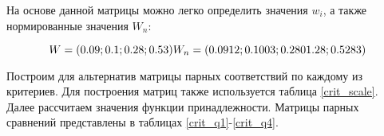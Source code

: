 
  \begin{table}[H]
    \caption{Шкала оценок критериев}\label{crit_scale}
  \end{table}

На основе данной матрицы можно легко определить значения $w_i$, а также нормированные значения $W_n$:

\begin{equation}
    W=(0.09;0.1;0.28;0.53) \\
    W_n=(0.0912;0.1003;0.2801.28;0.5283)
\end{equation}

Построим для альтернатив матрицы парных соответствий по каждому из критериев. 
Для построения матриц также используется таблица \ref{crit_scale}. 
Далее рассчитаем значения функции принадлежности.
Матрицы парных сравнений представлены в таблицах \ref{crit_q1}-\ref{crit_q4}.

